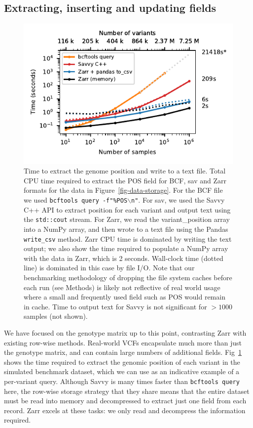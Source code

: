 \documentclass[a4paper,num-refs]{oup-contemporary}
\begin{document}
\subsection{Extracting, inserting and updating fields}
\begin{figure}
\includegraphics{figures/column-extract}
\caption{Time to extract the genome position and write to a text file.
Total CPU time required to extract the POS field for BCF,
sav and Zarr formats
for the data in Figure~\ref{fig-data-storage}.
For the BCF file we used \texttt{bcftools query -f"\%POS$\backslash$n"}.
For sav, we used the Savvy C++ API to extract position for each variant
and output text using the \texttt{std::cout} stream. For Zarr, we read 
the variant\_position array into a NumPy array, and then wrote to
a text file using the Pandas \texttt{write\_csv} method. 
Zarr CPU time is dominated by writing the text output; we also show
the time required to populate a NumPy array with the data in Zarr,
which is 2 seconds. Wall-clock time (dotted line) is dominated 
in this case by file I/O. Note that our benchmarking methodology of 
dropping the file system caches before each run (see Methods) is
likely not reflective of real world usage where a small and 
frequently used field such as POS would remain in cache.
Time to output text for Savvy is not significant
for $> 1000$ samples (not shown).
\label{fig-column-extract}}
\end{figure}
We have focused on the genotype matrix up to this point, contrasting
Zarr with existing row-wise methods.
Real-world VCFs encapsulate much more than just the genotype
matrix, and can contain large numbers of additional fields.
Fig~\ref{fig-column-extract} shows the time required to extract 
the genomic position of each variant in the simulated benchmark 
dataset, which we can use as an indicative example of a per-variant 
query. Although Savvy is many times faster than \texttt{bcftools query}
here, the row-wise storage strategy that they share means that 
the entire dataset must be read into memory and 
decompressed to extract just one field from each record. Zarr
excels at these tasks: we only read and decompress the information required.
\end{document}
